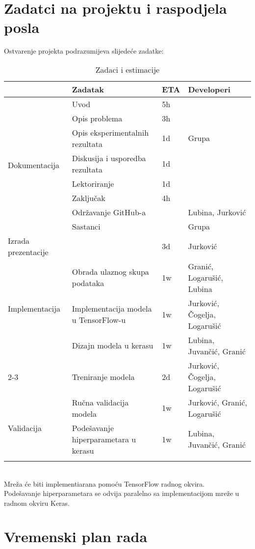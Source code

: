 \documentclass{report}
\begin{document}
\section{Zadatci na projektu i raspodjela posla}
Ostvarenje projekta podrazumijeva slijedeće zadatke:
\begin{longtable}{|p{100pt}| p{110pt} |p{20pt}| p{80pt}|}
\hline
 & \textbf{Zadatak} & \textbf{ETA} & \textbf{Developeri}\\
\hline
\multirow{8}{*}{Dokumentacija} & Uvod & 5h \\ \cline{3-3}
 & Opis problema & 3h \\ \cline{2-3}
 & Opis eksperimentalnih rezultata & 1d & Grupa \\ \cline{2-3}
 & Diskusija i usporedba rezultata & 1d \\ \cline{2-3}
 & Lektoriranje & 1d \\ \cline{2-3}
 & Zaključak & 4h \\ \hline
\multirow{2}{*}{Administrativni poslovi} & Održavanje GitHub-a & & Lubina, Jurković\\ \cline{2-3} & Sastanci & & Grupa \\ \hline
\multirow{1}{*}{Izrada prezentacije} &  & 3d & Jurković \\ \hline
\multirow{3}{*}{Implementacija} & Obrada ulaznog skupa podataka & 1w & Granić,  Logarušić, Lubina \\ \cline{2-3}
& Implementacija modela u TensorFlow-u & 1w & Jurković, Čogelja, Logarušić \\ \hline
& Dizajn modela u kerasu & 1w & Lubina, Juvančić, Granić \\ \cline{2-3}
\multirow{2}{*}{Treniranje}
 & Treniranje modela & 2d & Jurković, Čogelja, Logarušić\\ \hline
\multirow{3}{*}{Validacija} & Ručna validacija modela & 1w & Jurković, Granić,  Logarušić\\ \cline{2-3} 
 & Podešavanje hiperparametara u kerasu & 1w & Lubina, Juvančić, Granić  \\ \hline 
 
\caption{Zadaci i estimacije}

\end{longtable}
\ \\
Mreža će biti implementiarana pomoću TensorFlow radnog okvira.\\
Podešavanje hiperparametara se odvija paralelno sa implementacijom mreže u radnom okviru Keras.\\

\section{Vremenski plan rada}
\end{document}
